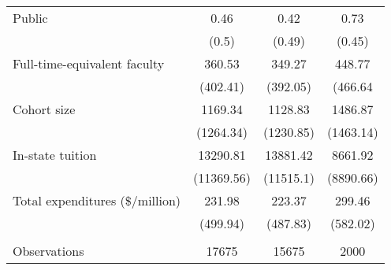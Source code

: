 \documentclass{article}
\begin{document}
\begin{table}[htbp]
\begin{tabular}{l c c c}
 Public
 & 0.46 & 0.42 & 0.73\\
 & (0.5) & (0.49) & (0.45)\\
 
 Full-time-equivalent faculty
 & 360.53 & 349.27& 448.77\\
 & (402.41) & (392.05) & (466.64\\
 
 Cohort size 
 & 1169.34 & 1128.83 & 1486.87\\
 & (1264.34) & (1230.85) & (1463.14)\\
 
 In-state tuition
 & 13290.81 & 13881.42 & 8661.92\\
 & (11369.56) & (11515.1) & (8890.66)\\
 
 Total expenditures (\$/million)
 & 231.98 & 223.37 & 299.46\\
 & (499.94) & (487.83) & (582.02)\\
 &&&\\
 
 Observations & 17675 & 15675 & 2000 \\
 \end{tabular}
\end{table}
\end{document}
